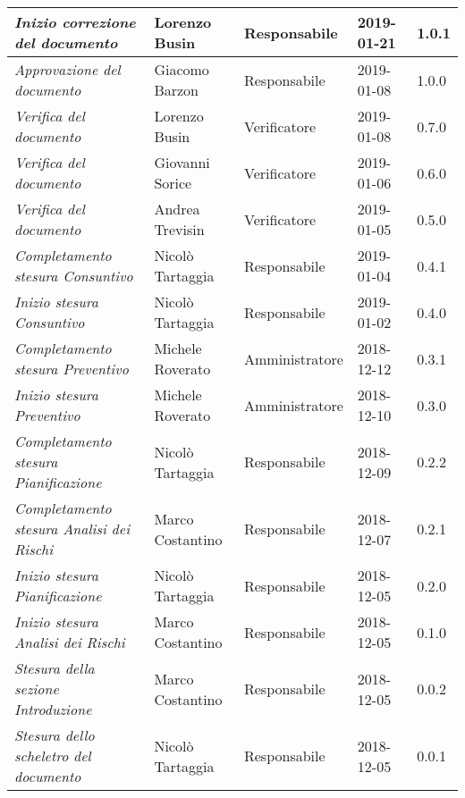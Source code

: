 \begin{longtable}{p{4cm}|C{3cm}|C{3cm}|R{2.5cm}|R{2cm}}
		\emph{Inizio correzione del documento} & Lorenzo Busin & Responsabile & 2019-01-21 & 1.0.1 \\
		\hline

		\emph{Approvazione del documento} & Giacomo Barzon & Responsabile & 2019-01-08 & 1.0.0 \\
		\hline

		\emph{Verifica del documento} & Lorenzo Busin & Verificatore & 2019-01-08 & 0.7.0 \\
		\hline

		\emph{Verifica del documento} & Giovanni Sorice & Verificatore & 2019-01-06 & 0.6.0 \\
		\hline

		\emph{Verifica del documento} & Andrea Trevisin & Verificatore & 2019-01-05 & 0.5.0 \\
		\hline

		\emph{Completamento stesura Consuntivo} & Nicolò Tartaggia & Responsabile & 2019-01-04 & 0.4.1 \\
		\hline

		\emph{Inizio stesura Consuntivo} & Nicolò Tartaggia & Responsabile & 2019-01-02 & 0.4.0 \\
		\hline

		\emph{Completamento stesura Preventivo} & Michele Roverato & Amministratore & 2018-12-12 & 0.3.1 \\
		\hline

		\emph{Inizio stesura Preventivo} & Michele Roverato & Amministratore & 2018-12-10 & 0.3.0 \\
		\hline

		\emph{Completamento stesura Pianificazione} & Nicolò Tartaggia & Responsabile & 2018-12-09 & 0.2.2 \\
		\hline

		\emph{Completamento stesura Analisi dei Rischi} & Marco Costantino & Responsabile & 2018-12-07 & 0.2.1 \\
		\hline

		\emph{Inizio stesura Pianificazione} & Nicolò Tartaggia & Responsabile & 2018-12-05 & 0.2.0 \\
		\hline

		\emph{\textit{Inizio stesura Analisi dei Rischi}} & Marco Costantino & Responsabile & 2018-12-05 & 0.1.0 \\
		\hline

		\emph{Stesura della sezione Introduzione} & Marco Costantino & Responsabile & 2018-12-05 & 0.0.2 \\
		\hline

		\emph{Stesura dello scheletro del documento} & Nicolò Tartaggia & Responsabile & 2018-12-05 & 0.0.1 \\

	\end{longtable}

\clearpage
